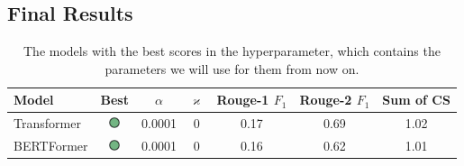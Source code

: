 \subsection{Final Results}

\begin{table}[h]
	\centering
	\begin{tabular}{l c | c c | c c c}
		\toprule
			Model & Best & $\alpha$ & $\varkappa$ & Rouge-1 $F_1$ & Rouge-2 $F_1$ & Sum of CS \\
		\midrule
			Transformer & \includegraphics[width=9pt,height=9pt]{green_circle.png} & 0.0001 & 0 & 0.17 & 0.69 & 1.02 \\
			BERTFormer & \includegraphics[width=9pt,height=9pt]{green_circle.png} & 0.0001 & 0 & 0.16 & 0.62 & 1.01 \\
		\bottomrule
	\end{tabular}
	\caption{The models with the best scores in the hyperparameter, which contains the parameters we will use for them from now on.}
\end{table}

